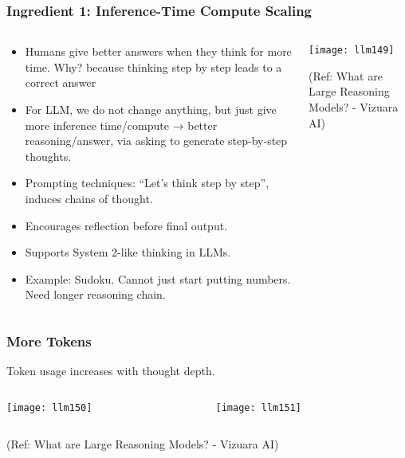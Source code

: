 \begin{frame}[fragile]\frametitle{Ingredient 1: Inference-Time Compute Scaling}

\begin{columns}
    \begin{column}[T]{0.8\linewidth}
		\begin{itemize}
		  \item Humans give better answers when they think for more time. Why? because thinking step by step leads to a correct answer
		  \item For LLM, we do not change anything, but just give more inference time/compute → better reasoning/answer, via asking to generate step-by-step thoughts.
		  \item Prompting techniques: ``Let’s think step by step'', induces chains of thought.
		  \item Encourages reflection before final output.
		  \item Supports System 2-like thinking in LLMs.
		  \item Example: Sudoku. Cannot just start putting numbers. Need longer reasoning chain.
		  
		\end{itemize}

    \end{column}
    \begin{column}[T]{0.2\linewidth}
		\begin{center}
		\texttt{[image: llm149]}
		
		{\tiny (Ref: What are Large Reasoning Models? - Vizuara AI)}
		
		\end{center}
    \end{column}
  \end{columns}


\end{frame}

\begin{frame}[fragile]\frametitle{More Tokens}

Token usage increases with thought depth.

\begin{columns}
    \begin{column}[T]{0.5\linewidth}
		\begin{center}
		\texttt{[image: llm150]}
		\end{center}

    \end{column}
    \begin{column}[T]{0.5\linewidth}
		\begin{center}
		\texttt{[image: llm151]}
		\end{center}
    \end{column}
  \end{columns}
  

{\tiny (Ref: What are Large Reasoning Models? - Vizuara AI)}

\end{frame}

